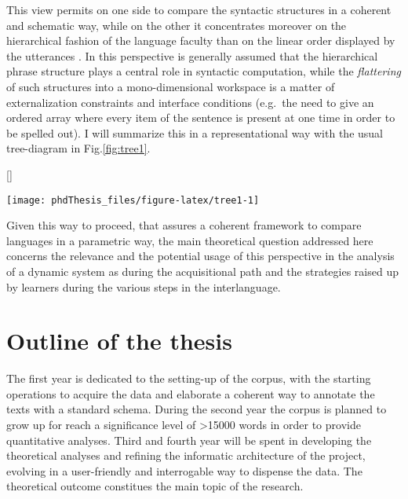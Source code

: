 \documentclass[
  a4paper,
  twoside,
  12pt,
  chapterprefix=false,
  bibliography=totocnumbered,
  listof=flat]{scrbook}
\makeatletter
\renewenvironment{figure}[1][\fps@figure]{
  \edef\@tempa{\noexpand\@float{figure}[#1]} 
  \@tempa
  \sffamily
}{
  \end@float
}
\makeatother
\begin{document}
This view permits on one side to compare the syntactic structures in a coherent and schematic way, while on the other it concentrates moreover on the hierarchical fashion of the language faculty than on the linear order displayed by the utterances \citep{kayne1994, moro2000}. In this perspective is generally assumed that the hierarchical phrase structure plays a central role in syntactic computation, while the \emph{flattering} of such structures into a mono-dimensional workspace is a matter of externalization constraints and interface conditions (e.g.~the need to give an ordered array where every item of the sentence is present at one time in order to be spelled out).
I will summarize this in a representational way with the usual tree-diagram in Fig.\ref{fig:tree1}.

\begin{figure}

{\centering \texttt{[image: phdThesis\_files/figure-latex/tree1-1]} 

}

\caption{Structural representation of a simple sentence}\label{fig:tree1}
\end{figure}

Given this way to proceed, that assures a coherent framework to compare languages in a parametric way, the main theoretical question addressed here concerns the relevance and the potential usage of this perspective in the analysis of a dynamic system as during the acquisitional path and the strategies raised up by learners during the various steps in the interlanguage.

\hypertarget{outline-of-the-thesis}{%
\section{Outline of the thesis}\label{outline-of-the-thesis}}

The first year is dedicated to the setting-up of the corpus, with the starting operations to acquire the data and elaborate a coherent way to annotate the texts with a standard schema. During the second year the corpus is planned to grow up for reach a significance level of \textgreater15000 words in order to provide quantitative analyses.
Third and fourth year will be spent in developing the theoretical analyses and refining the informatic architecture of the project, evolving in a user-friendly and interrogable way to dispense the data. The theoretical outcome constitues the main topic of the research.
\end{document}
